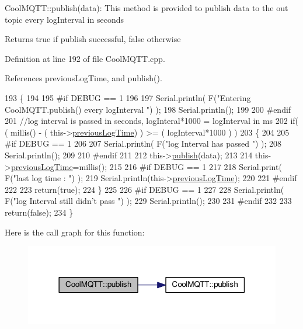Cool\+M\+Q\+T\+T\+::publish(data)\+: This method is provided to publish data to the out topic every log\+Interval in seconds

\begin{DoxyReturn}{Returns}
true if publish successful, false otherwise 
\end{DoxyReturn}


Definition at line 192 of file Cool\+M\+Q\+T\+T.\+cpp.



References previous\+Log\+Time, and publish().


\begin{DoxyCode}
193 \{
194 
195 \textcolor{preprocessor}{#if DEBUG == 1 }
196 
197     Serial.println( F(\textcolor{stringliteral}{"Entering CoolMQTT.publish() every logInterval "}) );
198     Serial.println();
199 
200 \textcolor{preprocessor}{#endif }
201     \textcolor{comment}{//log interval is passed in seconds, logInteral*1000 = logInterval in ms}
202     \textcolor{keywordflow}{if}( ( millis() - ( this->\hyperlink{classCoolMQTT_a3db37ef9ed3b05b2a8d44edba0e7d3cc}{previousLogTime})  ) >= ( logInterval*1000 ) )
203     \{
204     
205 \textcolor{preprocessor}{    #if DEBUG == 1}
206 
207         Serial.println( F(\textcolor{stringliteral}{"log Interval has passed "}) );
208         Serial.println();
209     
210 \textcolor{preprocessor}{    #endif}
211 
212         this->\hyperlink{classCoolMQTT_ace977b3e90ab14b1199fe5c4fb0a13ec}{publish}(data);
213 
214         this->\hyperlink{classCoolMQTT_a3db37ef9ed3b05b2a8d44edba0e7d3cc}{previousLogTime}=millis();
215     
216 \textcolor{preprocessor}{    #if DEBUG == 1 }
217 
218         Serial.print( F(\textcolor{stringliteral}{"last log time : "}) );
219         Serial.println(this->\hyperlink{classCoolMQTT_a3db37ef9ed3b05b2a8d44edba0e7d3cc}{previousLogTime});
220 
221 \textcolor{preprocessor}{    #endif}
222 
223         \textcolor{keywordflow}{return}(\textcolor{keyword}{true});
224     \}
225 
226 \textcolor{preprocessor}{#if DEBUG == 1 }
227 
228     Serial.println( F(\textcolor{stringliteral}{"log Interval still didn't pass "}) ); 
229     Serial.println();
230 
231 \textcolor{preprocessor}{#endif}
232 
233     \textcolor{keywordflow}{return}(\textcolor{keyword}{false});
234 \}
\end{DoxyCode}
Here is the call graph for this function\+:
\nopagebreak
\begin{figure}[H]
\begin{center}
\leavevmode
\includegraphics[width=318pt]{classCoolMQTT_a613c5e3927ae85bb94fbf648d84d8780_cgraph}
\end{center}
\end{figure}
\mbox{\label{classCoolMQTT_ae3c18f6ae9723746d32765f1c8f176ca}} 
